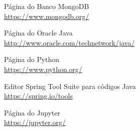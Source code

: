 \documentclass[a4paper,11pt]{article}
\begin{document}


\begin{thebibliography}{8}
  Página do Banco MongoDB \\
  \url{https://www.mongodb.org/}

  Página do Oracle Java \\
  \url{http://www.oracle.com/technetwork/java/}
  
  Página do Python \\
  \url{https://www.python.org/}

  Editor Spring Tool Suite para códigos Java \\
  \url{https://spring.io/tools}

  Página do Jupyter \\
  \url{https://jupyter.org/}

  
\end{thebibliography}
  
\end{document}
